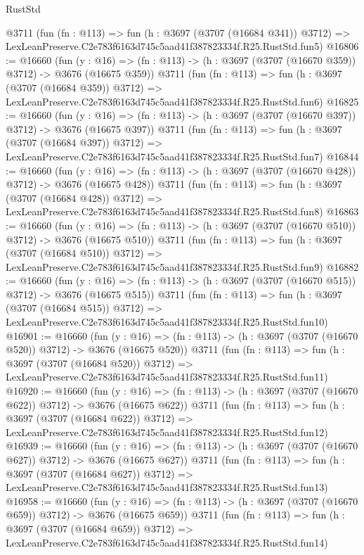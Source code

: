 \begin{lexlean}{RustStd}
\begin{coremodule}
    @3711
    (fun (fn : @113) =>
    fun (h : @3697 (@3707 (@16684 @341)) @3712) =>
    LexLeanPreserve.C2e783f6163d745c5aad41f387823334f.R25.RustStd.fun5)
@16806 := @16660
    (fun (y : @16) => (fn : @113) -> (h : @3697 (@3707 (@16670 @359)) @3712) -> @3676 (@16675 @359))
    @3711
    (fun (fn : @113) =>
    fun (h : @3697 (@3707 (@16684 @359)) @3712) =>
    LexLeanPreserve.C2e783f6163d745c5aad41f387823334f.R25.RustStd.fun6)
@16825 := @16660
    (fun (y : @16) => (fn : @113) -> (h : @3697 (@3707 (@16670 @397)) @3712) -> @3676 (@16675 @397))
    @3711
    (fun (fn : @113) =>
    fun (h : @3697 (@3707 (@16684 @397)) @3712) =>
    LexLeanPreserve.C2e783f6163d745c5aad41f387823334f.R25.RustStd.fun7)
@16844 := @16660
    (fun (y : @16) => (fn : @113) -> (h : @3697 (@3707 (@16670 @428)) @3712) -> @3676 (@16675 @428))
    @3711
    (fun (fn : @113) =>
    fun (h : @3697 (@3707 (@16684 @428)) @3712) =>
    LexLeanPreserve.C2e783f6163d745c5aad41f387823334f.R25.RustStd.fun8)
@16863 := @16660
    (fun (y : @16) => (fn : @113) -> (h : @3697 (@3707 (@16670 @510)) @3712) -> @3676 (@16675 @510))
    @3711
    (fun (fn : @113) =>
    fun (h : @3697 (@3707 (@16684 @510)) @3712) =>
    LexLeanPreserve.C2e783f6163d745c5aad41f387823334f.R25.RustStd.fun9)
@16882 := @16660
    (fun (y : @16) => (fn : @113) -> (h : @3697 (@3707 (@16670 @515)) @3712) -> @3676 (@16675 @515))
    @3711
    (fun (fn : @113) =>
    fun (h : @3697 (@3707 (@16684 @515)) @3712) =>
    LexLeanPreserve.C2e783f6163d745c5aad41f387823334f.R25.RustStd.fun10)
@16901 := @16660
    (fun (y : @16) => (fn : @113) -> (h : @3697 (@3707 (@16670 @520)) @3712) -> @3676 (@16675 @520))
    @3711
    (fun (fn : @113) =>
    fun (h : @3697 (@3707 (@16684 @520)) @3712) =>
    LexLeanPreserve.C2e783f6163d745c5aad41f387823334f.R25.RustStd.fun11)
@16920 := @16660
    (fun (y : @16) => (fn : @113) -> (h : @3697 (@3707 (@16670 @622)) @3712) -> @3676 (@16675 @622))
    @3711
    (fun (fn : @113) =>
    fun (h : @3697 (@3707 (@16684 @622)) @3712) =>
    LexLeanPreserve.C2e783f6163d745c5aad41f387823334f.R25.RustStd.fun12)
@16939 := @16660
    (fun (y : @16) => (fn : @113) -> (h : @3697 (@3707 (@16670 @627)) @3712) -> @3676 (@16675 @627))
    @3711
    (fun (fn : @113) =>
    fun (h : @3697 (@3707 (@16684 @627)) @3712) =>
    LexLeanPreserve.C2e783f6163d745c5aad41f387823334f.R25.RustStd.fun13)
@16958 := @16660
    (fun (y : @16) => (fn : @113) -> (h : @3697 (@3707 (@16670 @659)) @3712) -> @3676 (@16675 @659))
    @3711
    (fun (fn : @113) =>
    fun (h : @3697 (@3707 (@16684 @659)) @3712) =>
    LexLeanPreserve.C2e783f6163d745c5aad41f387823334f.R25.RustStd.fun14)

\end{coremodule}
\end{lexlean}
